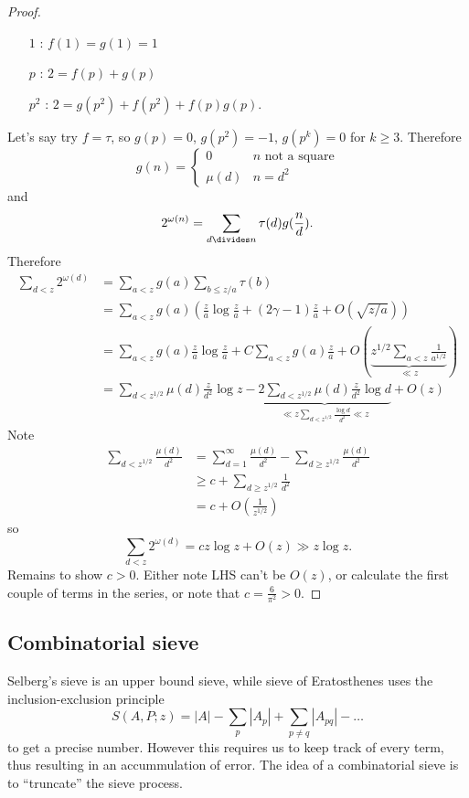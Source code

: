\documentclass[a4paper]{article}
\begin{document}
\begin{proof}
\begin{enumerate}
  \item[\(1\)]: \(f(1) = g(1) = 1\)
  \item[\(p\)]: \(2 = f(p) + g(p)\)
  \item[\(p^2\)]: \(2 = g(p^2) + f(p^2) + f(p)g(p)\).
  \end{enumerate}
  Let's say try \(f = \tau\), so \(g(p) = 0\), \(g(p^2) = -1\), \(g(p^k) = 0\) for \(k \geq 3\). Therefore
  \[
    g(n) =
    \begin{cases}
      0 & n \text{ not a square} \\
      \mu(d) & n = d^2
    \end{cases}
  \]
  and
  \[
    2^{\omega(n)} = \sum_{d \divides n} \tau(d) g(\frac{n}{d}).
  \]
  Therefore
  \begin{align*}
    \sum_{d < z} 2^{\omega(d)}
    &= \sum_{a < z} g(a) \sum_{b \leq z/a} \tau(b) \\
    &= \sum_{a < z} g(a) \left( \frac{z}{a} \log \frac{z}{a} + (2\gamma - 1) \frac{z}{a} + O(\sqrt{z/a}) \right) \\
    &= \sum_{a < z} g(a) \frac{z}{a} \log \frac{z}{a} + C \sum_{a < z} g(a) \frac{z}{a} + O(\underbrace{z^{1/2} \sum_{a < z} \frac{1}{a^{1/2}}}_{\ll z}) \\
    &= \sum_{d < z^{1/2}} \mu(d) \frac{z}{d^2} \log z - \underbrace{2 \sum_{d < z^{1/2}} \mu(d) \frac{z}{d^2} \log d}_{\ll z \sum_{d < z^{1/2}} \frac{\log d}{d^2} \ll z} + O(z)
  \end{align*}
  Note
  \begin{align*}
    \sum_{d < z^{1/2}} \frac{\mu(d)}{d^2}
    &= \sum_{d = 1}^\infty \frac{\mu(d)}{d^2} - \sum_{d \geq z^{1/2}} \frac{\mu(d)}{d^2} \\
    &\geq c + \sum_{d \geq z^{1/2}} \frac{1}{d^2} \\
    &= c + O(\frac{1}{z^{1/2}})
  \end{align*}
  so
  \[
    \sum_{d < z} 2^{\omega(d)} = c z \log z + O(z) \gg z \log z.
  \]
  Remains to show \(c > 0\). Either note LHS can't be \(O(z)\), or calculate the first couple of terms in the series, or note that \(c = \frac{6}{\pi^2} > 0\).
\end{proof}

\subsection{Combinatorial sieve}

Selberg's sieve is an upper bound sieve, while sieve of Eratosthenes uses the inclusion-exclusion principle
\[
  S(A, P; z) = |A| - \sum_p |A_p| + \sum_{p \neq q} |A_{pq}| - \dots
\]
to get a precise number. However this requires us to keep track of every term, thus resulting in an accummulation of error. The idea of a combinatorial sieve is to ``truncate'' the sieve process.
\end{document}
